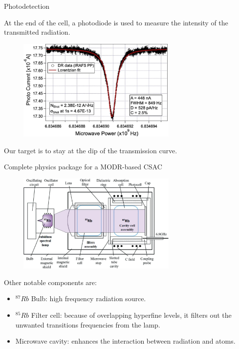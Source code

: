 \begin{frame}{Photodetection}

    At the end of the cell, a photodiode is used to measure the intensity of the transmitted radiation.

    \begin{figure}
        \centering
        \includegraphics[width=0.7\textwidth]{img/Transmission}
    \end{figure}

    Our target is to stay at the dip of the transmission curve.

\end{frame}



\begin{frame}{Complete physics package for a MODR-based CSAC}


    \begin{figure}
        \centering
        \includegraphics[width=0.7\textwidth]{img/Rubidium-Atomic-Clock-Physics-Package}
    \end{figure}

    Other notable components are:

    \begin{itemize}
        \item $^{87}Rb$ Bulb: high frequency radiation source.
        \item $^{85}Rb$ Filter cell: because of overlapping hyperfine levels, it filters out the unwanted transitions frequencies from the lamp.
        \item Microwave cavity: enhances the interaction between radiation and atoms.
    \end{itemize}

\end{frame}


